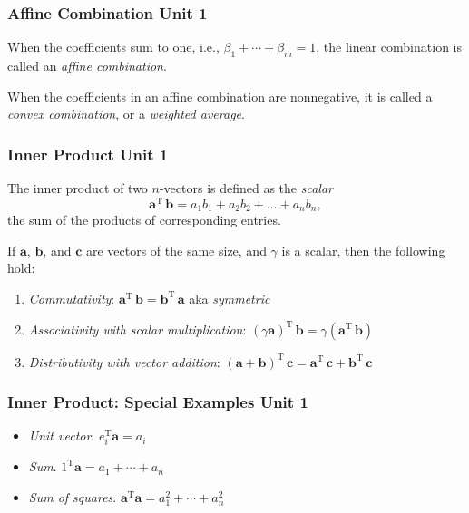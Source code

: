 \documentclass[12pt]{beamer}
\newcommand{\FrameTitle}[2]{\frametitle{#1 \hfill \small\textnormal{\textcolor{midgray}{#2}}}}
\newcommand{\vsp}{\vspace*{1em}}
\newcommand{\Vector}[1]{\textbf{#1}}
\begin{document}
\begin{frame}\FrameTitle{Affine Combination}{Unit 1}
    When the coefficients sum to one, i.e., $\beta_1 + \cdots + \beta_m = 1$,
    the linear combination is called an \emph{affine combination}.

    \vsp

    When the coefficients in an affine combination are nonnegative,
    it is called a \emph{convex combination}, or a \emph{weighted average}.
\end{frame}

\begin{frame}\FrameTitle{Inner Product}{Unit 1}
    \begin{definition}
        The inner product of two $n$-vectors is defined as the \emph{scalar}
        \[
            \Vector{a}^{\textrm{T}}\,\Vector{b} = a_1b_1 + a_2b_2 + \ldots + a_nb_n,
        \]
        the sum of the products of corresponding entries.
    \end{definition}
    \vsp
    If $\Vector{a}$, $\Vector{b}$, and $\Vector{c}$ are vectors of the same size, and {\color{yellow}$\gamma$} is a scalar, then the following hold:\vspace*{2pt}\\
    \begin{enumerate}
        \item \emph{Commutativity}: $\Vector{a}^{\textrm{T}}\,\Vector{b} = \Vector{b}^{\textrm{T}}\,\Vector{a}$ aka \emph{symmetric}\vspace*{3pt}\\
        \item \emph{Associativity with scalar multiplication}: $(\gamma \Vector{a})^{\textrm{T}}\,\Vector{b} = \gamma (\Vector{a}^{\textrm{T}}\,\Vector{b})$ \vspace*{3pt}\\
        \item \emph{Distributivity with vector addition}: $(\Vector{a}+\Vector{b})^{\textrm{T}}\,\Vector{c} = \Vector{a}^{\textrm{T}}\,\Vector{c} + \Vector{b}^{\textrm{T}}\,\Vector{c}$
    \end{enumerate}
\end{frame}

\begin{frame}\FrameTitle{Inner Product: Special Examples}{Unit 1}
    \begin{itemize}
        \item \emph{Unit vector}. $e^{\textrm{T}}_i \Vector{a} = a_i$
        \item \emph{Sum}. $1^{\textrm{T}} \Vector{a}= a_1 + \cdots + a_n$
        \item \emph{Sum of squares}. $\Vector{a}^{\textrm{T}} \Vector{a} = a^2_1 + \cdots + a^2_n$
    \end{itemize}
\end{frame}
\end{document}
